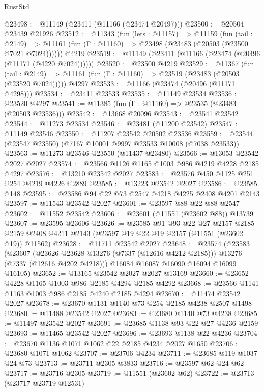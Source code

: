 \begin{lexlean}{RustStd}
\begin{coremodule}
@23498 := @11149 (@23411 (@11166 (@23474 @20497)))
@23500 := @20504 @23439 @21926
@23512 := @11343
    (fun (lets : @11157) =>
    @11159
      (fun (tail : @2149) =>
      @11161 (fun (Γ : @11160) => @23498 (@23483 (@20503 (@23500 @7021 @7024))))))
    @4219
@23519 := @11149 (@23411 (@11166 (@23474 (@20496 (@11171 (@4220 @7024))))))
@23520 := @23500 @4219
@23529 := @11367
    (fun (tail : @2149) => @11161 (fun (Γ : @11160) => @23519 (@23483 (@20503 (@23520 @7024)))))
    @4297
@23533 := @11166 (@23474 (@20496 (@11171 @4298)))
@23534 := @23411 @23533
@23535 := @11149 @23534
@23536 := @23520 @4297
@23541 := @11385 (fun (Γ : @11160) => @23535 (@23483 (@20503 @23536)))
@23542 := @13668 @20096
@23543 := @23541 @23542
@23544 := @11273 @23534
@23546 := @23481 (@11200 @23542)
@23547 := @11149 @23546
@23550 := @11207 @23542 @20502 @23536
@23559 := @23544 (@23547 @23550) (@7167 @10001 @9997 @23533 @10008 (@7038 @23533))
@23563 := @11273 @23546 @23550 (@11437 @23480)
@23566 := @13053 @23542 @2027 @2027
@23574 := @23566 @1126 @1165 @1003 @986 @4219 @4228 @2185 @4297
@23576 := @13210 @23542 @2027
@23583 := @23576 @450 @1125 @251 @254 @4219 @4226 @2889
@23585 := @13223 @23542 @2027
@23586 := @23585 @148
@23595 := @23586 @94 @22 @73 @2547 @4218 @4225 @2408 @4201 @2143
@23597 := @11543 @23542 @2027
@23601 := @23597 @88 @22 @88 @2547
@23602 := @11552 @23542
@23606 := @23601 (@11551 (@23602 @88)) @13739
@23607 := @23595 @23606
@23626 := @23585
    @91
    @93
    @22
    @27
    @2157
    @2185
    @2159
    @2408
    @4211
    @2143
    (@23597 @19 @22 @19 @2157 (@11551 (@23602 @19)) @11562)
@23628 := @11711 @23542 @2027
@23648 := @23574
    (@23583
      (@23607
        (@23626 @23628 @13276 (@7337 (@12616 @4212 @2185)))
        @13276
        (@7337 (@12616 @4202 @4218)))
      @16084
      @16087
      @16090
      @16094
      @16099
      @16105)
@23652 := @13165 @23542 @2027 @2027 @13169
@23660 := @23652 @4228 @1165 @1003 @986 @2185 @4294 @2185 @4292
@23668 := @23566 @1141 @1163 @1003 @986 @2185 @4240 @2185 @4294
@23670 := @11474 @23542 @2027
@23678 := @23670 @1131 @1140 @73 @254 @2185 @4238 @2507 @1498
@23680 := @11488 @23542 @2027
@23683 := @23680 @1140 @73 @4238
@23685 := @11497 @23542 @2027
@23691 := @23685 @1138 @93 @22 @27 @4236 @2159
@23693 := @11465 @23542 @2027
@23696 := @23693 @1138 @22 @4236
@23704 := @23670 @1136 @1071 @1062 @22 @2185 @4234 @2027 @1650
@23706 := @23680 @1071 @1062
@23707 := @23706 @4234
@23711 := @23685 @119 @1037 @24 @73
@23713 := @23711 @2305 @3833
@23716 := @23597 @62 @24 @62
@23717 := @23716 @2305
@23719 := @11551 (@23602 @62)
@23722 := @23713 (@23717 @23719 @12531)

\end{coremodule}
\end{lexlean}
